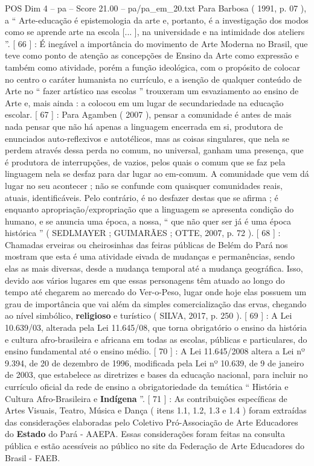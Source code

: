 \begin{textsample}{POS Dim 4 – pa – Score 21.00 – pa/pa\_em\_20.txt}
Para Barbosa ( 1991, p. 07 ), a “ Arte-educação é epistemologia da arte e, portanto, é a investigação dos modos como se aprende arte na escola [... ], na universidade e na intimidade dos ateliers ”. [ 66 ] : É inegável a importância do movimento de Arte Moderna no Brasil, que teve como ponto de atenção as concepções de Ensino da Arte como expressão e também como atividade, porém a função ideológica, com o propósito de colocar no centro o caráter humanista no currículo, e a isenção de qualquer conteúdo de Arte no “ fazer artístico nas escolas ” trouxeram um esvaziamento ao ensino de Arte e, mais ainda : a colocou em um lugar de secundariedade na educação escolar. [ 67 ] : Para Agamben ( 2007 ), pensar a comunidade é antes de mais nada pensar que não há apenas a linguagem encerrada em si, produtora de enunciados auto-reflexivos e autotélicos, mas as coisas singulares, que nela se perdem através dessa perda no comum, no universal, ganham uma presença, que é produtora de interrupções, de vazios, pelos quais o comum que se faz pela linguagem nela se desfaz para dar lugar ao em-comum.
A comunidade que vem dá lugar no seu acontecer ; não se confunde com quaisquer comunidades reais, atuais, identificáveis.
Pelo contrário, é no desfazer destas que se afirma ; é enquanto apropriação/expropriação que a linguagem se apresenta condição do humano, e se anuncia uma época, a nossa, “ que não quer ser já é uma época histórica ” ( SEDLMAYER ; GUIMARÃES ; OTTE, 2007, p. 72 ). [ 68 ] : Chamadas erveiras ou cheirosinhas das feiras públicas de Belém do Pará nos mostram que esta é uma atividade eivada de mudanças e permanências, sendo elas as mais diversas, desde a mudança temporal até a mudança geográfica.
Isso, devido aos vários lugares em que essas personagens têm atuado ao longo do tempo até chegarem ao mercado do Ver-o-Peso, lugar onde hoje elas possuem um grau de importância que vai além da simples comercialização das ervas, chegando ao nível simbólico, \textbf{religioso} e turístico ( SILVA, 2017, p. 250 ). [ 69 ] : A Lei 10.639/03, alterada pela Lei 11.645/08, que torna obrigatório o ensino da história e cultura afro-brasileira e africana em todas as escolas, públicas e particulares, do ensino fundamental até o ensino médio. [ 70 ] : A Lei 11.645/2008 altera a Lei nº 9.394, de 20 de dezembro de 1996, modificada pela Lei nº 10.639, de 9 de janeiro de 2003, que estabelece as diretrizes e bases da educação nacional, para incluir no currículo oficial da rede de ensino a obrigatoriedade da temática “ História e Cultura Afro-Brasileira e \textbf{Indígena} ”. [ 71 ] : As contribuições específicas de Artes Visuais, Teatro, Música e Dança ( itens 1.1, 1.2, 1.3 e 1.4 ) foram extraídas das considerações elaboradas pelo Coletivo Pró-Associação de Arte Educadores do \textbf{Estado} do Pará - AAEPA.
Essas considerações foram feitas na consulta pública e estão acessíveis ao público no site da Federação de Arte Educadores do Brasil - FAEB.

\end{textsample}
